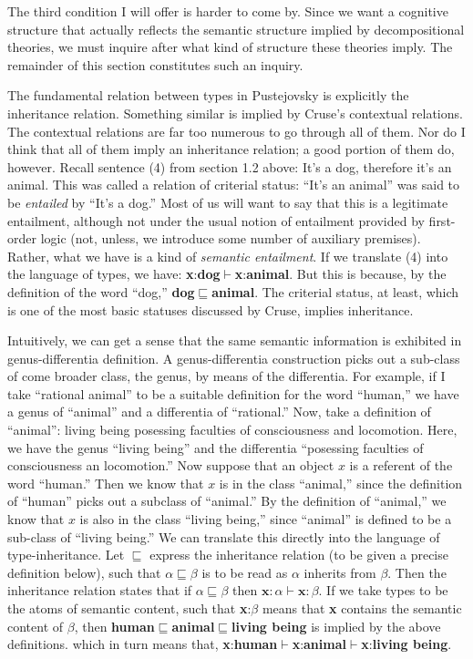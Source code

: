 \documentclass[12pt]{amsart}
\begin{document}
The third condition I will offer is harder to come by. Since we want a cognitive structure that actually reflects the semantic structure implied by decompositional theories, we must inquire after what kind of structure these theories imply. The remainder of this section constitutes such an inquiry.

The fundamental relation between types in Pustejovsky is explicitly the inheritance relation. Something similar is implied by Cruse's contextual relations. The contextual relations are far too numerous to go through all of them. Nor do I think that all of them imply an inheritance relation; a good portion of them do, however. Recall sentence (4) from section 1.2 above: It's a dog, therefore it's an animal. This was called a relation of criterial status: ``It's an animal'' was said to be \emph{entailed} by ``It's a dog.'' Most of us will want to say that this is a legitimate entailment, although not under the usual notion of entailment provided by first-order logic (not, unless, we introduce some number of auxiliary premises). Rather, what we have is a kind of \emph{semantic entailment}. If we translate (4) into the language of types, we have: {\bf x}:{\bf dog}$\vdash${\bf x}:{\bf animal}. But this is because, by the definition of the word ``dog,'' {\bf dog}$\sqsubseteq${\bf animal}. The criterial status, at least, which is one of the most basic statuses discussed by Cruse, implies inheritance.

Intuitively, we can get a sense that the same semantic information is exhibited in genus-differentia definition. A genus-differentia construction picks out a sub-class of come broader class, the genus, by means of the differentia. For example, if I take ``rational animal'' to be a suitable definition for the word ``human,'' we have a genus of ``animal'' and a differentia of ``rational.'' Now, take a definition of ``animal'': living being posessing faculties of consciousness and locomotion. Here, we have the genus ``living being'' and the differentia ``posessing faculties of consciousness an locomotion.'' Now suppose that an object $x$ is a referent of the word ``human.'' Then we know that $x$ is in the class ``animal,'' since the definition of ``human'' picks out a subclass of ``animal.'' By the definition of ``animal,'' we know that $x$ is also in the class ``living being,'' since ``animal'' is defined to be a sub-class of ``living being.'' We can translate this directly into the language of type-inheritance. Let $\sqsubseteq$ express the inheritance relation (to be given a precise definition below), such that $\alpha\sqsubseteq\beta$ is to be read as $\alpha$ inherits from $\beta$. Then the inheritance relation states that if $\alpha\sqsubseteq\beta$ then $\textbf{x}:\alpha\vdash\textbf{x}:\beta$. If we take types to be the atoms of semantic content, such that {\bf x}:$\beta$ means that {\bf x} contains the semantic content of $\beta$, then {\bf human}$\sqsubseteq${\bf animal}$\sqsubseteq${\bf living being} is implied by the above definitions. which in turn means that, {\bf x}:{\bf human}$\vdash${\bf x}:{\bf animal}$\vdash${\bf x}:{\bf living being}.
\end{document}
